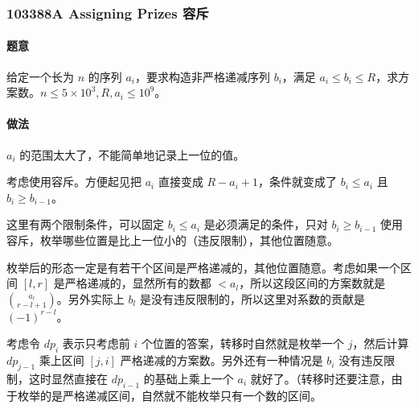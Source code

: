 \subsubsection{103388A Assigning Prizes 容斥}
	
	\paragraph{题意} 给定一个长为 $n$ 的序列 $a_i$，要求构造非严格递减序列 $b_i$，满足 $a_i \le b_i \le R$，求方案数。$n \le 5 \times 10 ^ 3, R, a_i \le 10 ^ 9$。
	
	\paragraph{做法} $a_i$ 的范围太大了，不能简单地记录上一位的值。

	考虑使用容斥。方便起见把 $a_i$ 直接变成 $R - a_i + 1$，条件就变成了 $b_i \le a_i$ 且 $b_i \ge b_{i - 1}$。

	这里有两个限制条件，可以固定 $b_i \le a_i$ 是必须满足的条件，只对 $b_i \ge b_{i - 1}$ 使用容斥，枚举哪些位置是比上一位小的（违反限制），其他位置随意。

	枚举后的形态一定是有若干个区间是严格递减的，其他位置随意。考虑如果一个区间 $[l, r]$ 是严格递减的，显然所有的数都 $< a_l$，所以这段区间的方案数就是 ${a_l \choose r - l + 1}$。另外实际上 $b_l$ 是没有违反限制的，所以这里对系数的贡献是 $(-1) ^ {r - l}$。

	考虑令 $dp_i$ 表示只考虑前 $i$ 个位置的答案，转移时自然就是枚举一个 $j$，然后计算 $dp_{j - 1}$ 乘上区间 $[j, i]$ 严格递减的方案数。另外还有一种情况是 $b_i$ 没有违反限制，这时显然直接在 $dp_{i - 1}$ 的基础上乘上一个 $a_i$ 就好了。（转移时还要注意，由于枚举的是严格递减区间，自然就不能枚举只有一个数的区间。

	\inputminted{cpp}{../src/dp/103388A.cpp}
